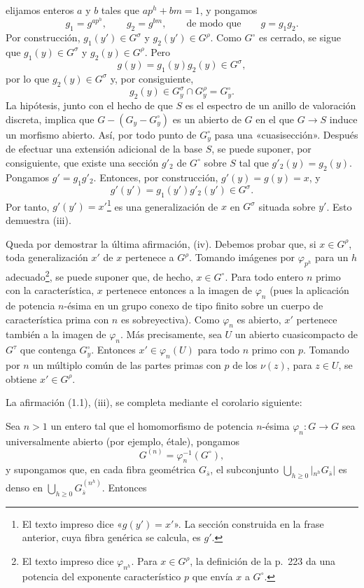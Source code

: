 elijamos enteros $a$ y $b$ tales que $ap^h+bm=1$, y pongamos
\[
g_1=g^{ap^h},\qquad g_2=g^{bm},\qquad\text{de modo que}\qquad g=g_1g_2.
\]
Por construcción, $g_1(y')\in G^\sigma$ y $g_2(y')\in G^\rho$. Como
$G^\circ$ es cerrado, se sigue que $g_1(y)\in G^\sigma$ y
$g_2(y)\in G^\rho$. Pero
\[
g(y)=g_1(y)g_2(y)\in G^\sigma,
\]
por lo que $g_2(y)\in G^\sigma$ y, por consiguiente,
\[
g_2(y)\in G_y^\sigma\cap G_y^\rho=G_y^\circ.
\]
La hipótesis, junto con el hecho de que $S$ es el espectro de un anillo de
valoración discreta, implica que $G-(G_y-G_y^\circ)$ es un abierto de $G$ en
el que $G\longrightarrow S$ induce un morfismo abierto. Así, por todo punto de
$G_y^\circ$ pasa una «cuasisección». Después de efectuar una extensión
adicional de la base $S$, se puede suponer, por consiguiente, que existe una
sección $g'_2$ de $G^\circ$ sobre $S$ tal que $g'_2(y)=g_2(y)$. Pongamos
$g'=g_1g'_2$. Entonces, por construcción, $g'(y)=g(y)=x$, y
\[
g'(y')=g_1(y')g'_2(y')\in G^\sigma.
\]
Por tanto, $g'(y')=x'$\footnote{El texto impreso dice «$g(y')=x'$». La sección
construida en la frase anterior, cuya fibra genérica se calcula, es $g'$.} es
una generalización de $x$ en $G^\sigma$ situada sobre $y'$. Esto demuestra
(iii).

Queda por demostrar la última afirmación, (iv). Debemos probar que, si
$x\in G^\rho$, toda generalización $x'$ de $x$ pertenece a $G^\rho$. Tomando
imágenes por $\varphi_{p^h}$ para un $h$ adecuado\footnote{El texto impreso
dice $\varphi_{n^h}$. Para $x\in G^\rho$, la definición de la p.~223 da una
potencia del exponente característico $p$ que envía $x$ a $G^\circ$.}, se
puede suponer que, de hecho, $x\in G^\circ$. Para todo entero $n$ primo con la
característica, $x$ pertenece entonces a la imagen de $\varphi_n$ (pues la
aplicación de potencia $n$-ésima en un grupo conexo de tipo finito sobre un
cuerpo de característica prima con $n$ es sobreyectiva). Como $\varphi_n$ es
abierto, $x'$ pertenece también a la imagen de $\varphi_n$. Más precisamente,
sea $U$ un abierto cuasicompacto de $G^\tau$ que contenga $G_y^\circ$.
Entonces $x'\in\varphi_n(U)$ para todo $n$ primo con $p$. Tomando por $n$ un
múltiplo común de las partes primas con $p$ de los $\nu(z)$, para $z\in U$, se
obtiene $x'\in G^\rho$.

La afirmación (1.1), (iii), se completa mediante el corolario siguiente:

 Sea $n>1$ un entero tal que el homomorfismo de potencia
$n$-ésima $\varphi_n:G\longrightarrow G$ sea universalmente abierto (por
ejemplo, étale), pongamos
\[
G^{(n)}=\varphi_n^{-1}(G^\circ),
\]
y supongamos que, en cada fibra geométrica $G_{\bar s}$, el subconjunto
$\bigcup_{h\geq0}|{}_{n^h}G_{\bar s}|$ es denso en
$\bigcup_{h\geq0}G_{\bar s}^{(n^h)}$. Entonces

